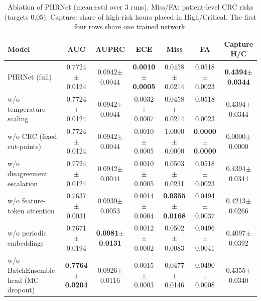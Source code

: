 \begin{table}[t]
\centering
\caption{Ablation of PHRNet (mean$\pm$std over 3 runs). Miss/FA: patient-level CRC risks (targets 0.05); Capture: share of high-risk hours placed in High/Critical. The first four rows share one trained network.}
\label{tab:ablation}
\footnotesize
\setlength{\tabcolsep}{3pt}
\renewcommand{\arraystretch}{1.15}
\begin{tabular}{lcccccc}
\toprule
\textbf{Model} & \textbf{AUC} & \textbf{AUPRC} & \textbf{ECE} & \textbf{Miss} & \textbf{FA} & \textbf{Capture H/C} \\
\midrule
PHRNet (full) & 0.7724$\pm$0.0124 & 0.0942$\pm$0.0044 & \textbf{0.0010$\pm$0.0005} & 0.0458$\pm$0.0214 & 0.0518$\pm$0.0023 & \textbf{0.4394$\pm$0.0344} \\
w/o temperature scaling & 0.7724$\pm$0.0124 & 0.0942$\pm$0.0044 & 0.0032$\pm$0.0007 & 0.0458$\pm$0.0214 & 0.0518$\pm$0.0023 & 0.4394$\pm$0.0344 \\
w/o CRC (fixed cut-points) & 0.7724$\pm$0.0124 & 0.0942$\pm$0.0044 & 0.0010$\pm$0.0005 & 1.0000$\pm$0.0000 & \textbf{0.0000$\pm$0.0000} & 0.0000$\pm$0.0000 \\
w/o disagreement escalation & 0.7724$\pm$0.0124 & 0.0942$\pm$0.0044 & 0.0010$\pm$0.0005 & 0.0503$\pm$0.0231 & 0.0518$\pm$0.0023 & 0.4394$\pm$0.0344 \\
w/o feature-token attention & 0.7637$\pm$0.0031 & 0.0939$\pm$0.0053 & 0.0014$\pm$0.0004 & \textbf{0.0355$\pm$0.0168} & 0.0494$\pm$0.0037 & 0.4213$\pm$0.0266 \\
w/o periodic embeddings & 0.7671$\pm$0.0194 & \textbf{0.0981$\pm$0.0131} & 0.0012$\pm$0.0002 & 0.0502$\pm$0.0083 & 0.0496$\pm$0.0041 & 0.4097$\pm$0.0392 \\
w/o BatchEnsemble head (MC dropout) & \textbf{0.7764$\pm$0.0204} & 0.0926$\pm$0.0116 & 0.0015$\pm$0.0003 & 0.0477$\pm$0.0146 & 0.0490$\pm$0.0008 & 0.4355$\pm$0.0340 \\
\bottomrule
\end{tabular}
\end{table}